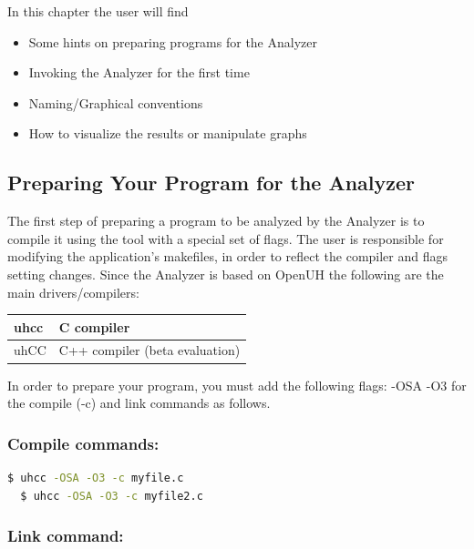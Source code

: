 In this chapter the user will find

\begin{itemize}
\item Some hints on preparing programs for the \openshmem Analyzer
\item Invoking the \openshmem Analyzer for the first time
\item Naming/Graphical conventions
\item How to visualize the results or manipulate graphs
\end{itemize}

\subsection{Preparing Your Program for the \openshmem Analyzer}

The first step of preparing a program to be analyzed by the \openshmem
Analyzer is to compile it using the tool with a special set of
flags. The user is responsible for modifying the application's
makefiles, in order to reflect the compiler and flags setting
changes. Since the \openshmem Analyzer is based on OpenUH the
following are the main drivers/compilers:

\vspace{0.1in}

\begin{center}
  \begin{tabular}{|l | l |}
    \hline
    uhcc & C compiler \\
    \hline
    uhCC & C++ compiler (beta evaluation) \\
    \hline
  \end{tabular}
\end{center}

\vspace{0.1in}

In order to prepare your program, you must add the following flags:
-OSA -O3 for the compile (-c) and link commands as follows.

\subsubsection*{Compile commands:}

\begin{lstlisting}[language=bash]
  $ uhcc -OSA -O3 -c myfile.c
  $ uhcc -OSA -O3 -c myfile2.c
\end{lstlisting}

\subsubsection*{Link command:}

